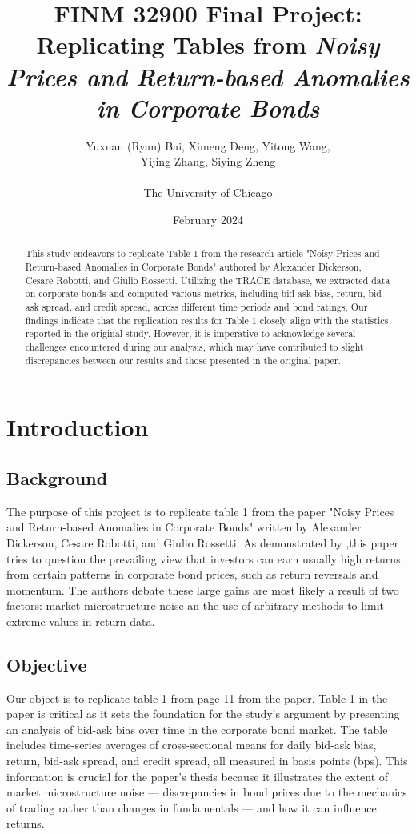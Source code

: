 \documentclass[12pt]{article}
\title{\textbf{FINM 32900 Final Project: Replicating Tables from \emph{Noisy Prices and Return-based Anomalies
in Corporate Bonds}}}
\author{Yuxuan (Ryan) Bai, Ximeng Deng, Yitong Wang, \\Yijing Zhang, Siying Zheng\\ \\The University of Chicago}
\date{February 2024}
\begin{document}
\maketitle

\begin{abstract}
This study endeavors to replicate Table 1 from the research article "Noisy Prices and Return-based Anomalies in Corporate Bonds" authored by Alexander Dickerson, Cesare Robotti, and Giulio Rossetti. Utilizing the TRACE database, we extracted data on corporate bonds and computed various metrics, including bid-ask bias, return, bid-ask spread, and credit spread, across different time periods and bond ratings. Our findings indicate that the replication results for Table 1 closely align with the statistics reported in the original study. However, it is imperative to acknowledge several challenges encountered during our analysis, which may have contributed to slight discrepancies between our results and those presented in the original paper.






\end{abstract}


\section{Introduction}
\subsection{Background}
The purpose of this project is to replicate table 1 from the paper "Noisy Prices and Return-based Anomalies in Corporate Bonds" written by Alexander Dickerson, Cesare Robotti, and Giulio Rossetti. As demonstrated by \cite{Dickerson2023Noisy},this paper tries to question the prevailing view that investors can earn usually high returns from certain patterns in corporate bond prices, such as return reversals and momentum. The authors debate these large gains are most likely a result of two factors: market microstructure noise an the use of arbitrary methods to limit extreme values in return data.


\subsection{Objective}
Our object is to replicate table 1 from page 11 from the paper. Table 1 in the paper is critical as it sets the foundation for the study's argument by presenting an analysis of bid-ask bias over time in the corporate bond market. The table includes time-series averages of cross-sectional means for daily bid-ask bias, return, bid-ask spread, and credit spread, all measured in basis points (bps). This information is crucial for the paper's thesis because it illustrates the extent of market microstructure noise — discrepancies in bond prices due to the mechanics of trading rather than changes in fundamentals — and how it can influence returns.
\end{document}
